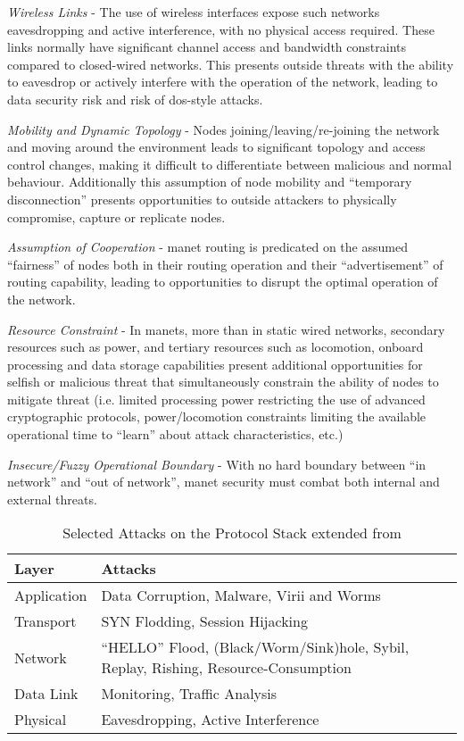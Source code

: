 \emph{Wireless Links} - The use of wireless interfaces expose such networks eavesdropping and active interference, with no physical access required.
These links normally have significant channel access and bandwidth constraints compared to closed-wired networks.
This presents outside threats with the ability to eavesdrop or actively interfere with the operation of the network, leading to data security risk and risk of \gls{dos}-style attacks.

\emph{Mobility and Dynamic Topology} - Nodes joining/leaving/re-joining the network and moving around the environment leads to significant topology and access control changes, making it difficult to differentiate between malicious and normal behaviour.
Additionally this assumption of node mobility and ``temporary disconnection'' presents opportunities to outside attackers to physically compromise, capture or replicate nodes.

\emph{Assumption of Cooperation} - \gls{manet} routing is predicated on the assumed ``fairness'' of nodes both in their routing operation and their ``advertisement'' of routing capability, leading to opportunities to disrupt the optimal operation of the network\cite{Papadimitratos2002}.

\emph{Resource Constraint} - In \glspl{manet}, more than in static wired networks, secondary resources such as power, and tertiary resources such as locomotion, onboard processing and data storage capabilities present additional opportunities for selfish or malicious threat that simultaneously constrain the ability of nodes to mitigate threat (i.e. limited processing power restricting the use of advanced cryptographic protocols, power/locomotion constraints limiting the available operational time to ``learn'' about attack characteristics, etc.)

\emph{Insecure/Fuzzy Operational Boundary} - With no hard boundary between ``in network'' and ``out of network'', \gls{manet} security must combat both internal and external threats.



\begin{table}
  \caption[Selected Attacks on the Protocol Stack]{Selected Attacks on the Protocol Stack extended from \cite{csen2010security}}
  \label{tab:stack_attacks}
  \begin{tabularx}{\textwidth}{p{5cm} X}\toprule
    Layer & Attacks\\\midrule
    Application & Data Corruption, Malware, Virii and Worms\\
    Transport & SYN Flodding, Session Hijacking\\
    Network & ``HELLO'' Flood, (Black/Worm/Sink)hole, Sybil, Replay, Rishing, Resource-Consumption\\
    Data Link & Monitoring, Traffic Analysis\\
    Physical& Eavesdropping, Active Interference\\\bottomrule
  \end{tabularx}
\end{table}


